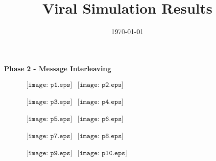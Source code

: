 \documentclass[a4paper,10pt]{article}
\title{Viral Simulation Results}
\author{}
\date{\today}
\begin{document}
\maketitle

\begin{center}
\textbf{Phase 2 - Message Interleaving}
\end{center}

\begin{figure}[h]
\begin{center}$
\begin{array}{cc}
\texttt{[image: p1.eps]} &
\texttt{[image: p2.eps]}
\end{array}$
\end{center}
\end{figure}

\begin{figure}[h]
\begin{center}$
\begin{array}{cc}
\texttt{[image: p3.eps]} &
\texttt{[image: p4.eps]}
\end{array}$
\end{center}
\end{figure}

\begin{figure}[h]
\begin{center}$
\begin{array}{cc}
\texttt{[image: p5.eps]} &
\texttt{[image: p6.eps]}
\end{array}$
\end{center}
\end{figure}

\begin{figure}[h]
\begin{center}$
\begin{array}{cc}
\texttt{[image: p7.eps]} &
\texttt{[image: p8.eps]}
\end{array}$
\end{center}
\end{figure}

\begin{figure}[h]
\begin{center}$
\begin{array}{cc}
\texttt{[image: p9.eps]} &
\texttt{[image: p10.eps]}
\end{array}$
\end{center}
\end{figure}

\end{document}
